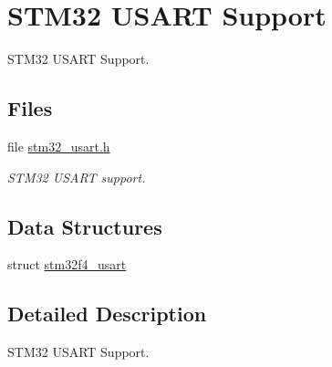 \hypertarget{group__stm32__usart}{}\section{S\+T\+M32 U\+S\+A\+RT Support}
\label{group__stm32__usart}


S\+T\+M32 U\+S\+A\+RT Support.  


\subsection*{Files}
\begin{DoxyCompactItemize}
\item 
file \mbox{\hyperlink{stm32__usart_8h}{stm32\+\_\+usart.\+h}}
\begin{DoxyCompactList}\small\item\em S\+T\+M32 U\+S\+A\+RT support. \end{DoxyCompactList}\end{DoxyCompactItemize}
\subsection*{Data Structures}
\begin{DoxyCompactItemize}
\item 
struct \mbox{\hyperlink{structstm32f4__usart}{stm32f4\+\_\+usart}}
\end{DoxyCompactItemize}


\subsection{Detailed Description}
S\+T\+M32 U\+S\+A\+RT Support. 

